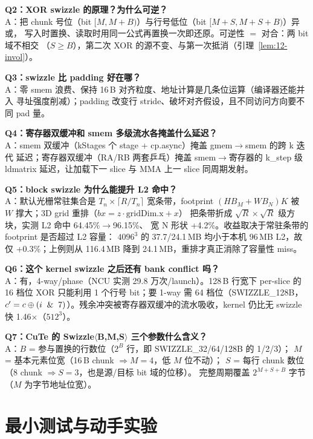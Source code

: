 \textbf{Q2：XOR swizzle 的原理？为什么可逆？}\\
A：把 chunk 号位（bit $[M,M{+}B)$）与行号低位（bit $[M{+}S,M{+}S{+}B)$）异或，
写入时置换、读取时用同一公式再置换一次即还原。可逆性 $=$ 对合：两 bit 域不相交
（$S\ge B$），第二次 XOR 的源不变、与第一次抵消（引理~\ref{lem:12-invol}）。

\textbf{Q3：swizzle 比 padding 好在哪？}\\
A：零 smem 浪费、保持 16\,B 对齐粒度、地址计算是几条位运算（编译器还能并入
寻址强度削减）；padding 改变行 stride、破坏对齐假设，且不同访问方向要不同
pad 量。

\textbf{Q4：寄存器双缓冲和 smem 多级流水各掩盖什么延迟？}\\
A：smem 双缓冲（kStages 个 stage + cp.async）掩盖 gmem$\to$smem 的跨 k 迭代
延迟；寄存器双缓冲（RA/RB 两套乒乓）掩盖 smem$\to$寄存器的 k\_step 级
ldmatrix 延迟，让加载下一 slice 与 MMA 上一 slice 同周期发射。

\textbf{Q5：block swizzle 为什么能提升 L2 命中？}\\
A：默认光栅常驻集合是 $T_n\times\lceil R/T_n\rceil$ 宽条带，footprint
$(H B_M+W B_N)K$ 被 $W$ 撑大；3D grid 重排（$bx=z\cdot\mathrm{gridDim.x}+x$）
把条带折成 $\sqrt{R}\times\sqrt{R}$ 级方块，实测 L2 命中 64.45\%$\to$96.15\%、
宽 N 形状 +4.2\%。收益取决于常驻条带的 footprint 是否超过 L2 容量：
$4096^3$ 的 37.7/24.1\,MB 均小于本机 96\,MB L2，故仅 +0.3\%；上例则从
116.4\,MB 降到 24.1\,MB，重排才真正消除了容量性 miss。

\textbf{Q6：这个 kernel swizzle 之后还有 bank conflict 吗？}\\
A：有，4-way/phase（NCU 实测 29.8 万次/launch）。128\,B 行宽下 per-slice 的
16 档位 XOR 只能利用 1 个行号 bit；要 1-way 需 64 档位（SWIZZLE\_128B，
$c'=c\oplus(i\And7)$）。残余冲突被寄存器双缓冲的流水吸收，kernel 仍比无
swizzle 快 1.46$\times$（$512^3$）。

\textbf{Q7：CuTe 的 Swizzle$\langle$B,M,S$\rangle$ 三个参数什么含义？}\\
A：$B$ = 参与置换的行数位（$2^B$ 行，即 SWIZZLE\_32/64/128B 的 1/2/3）；
$M$ = 基本元素位宽（16\,B chunk $\Rightarrow M{=}4$，低 $M$ 位不动）；
$S$ = 每行 chunk 数位（8 chunk $\Rightarrow S{=}3$，也是源/目标 bit 域的位移）。
完整周期覆盖 $2^{M+S+B}$ 字节（$M$ 为字节地址位宽）。

\section{最小测试与动手实验}

